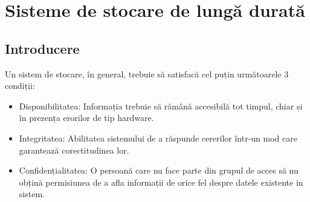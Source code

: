 \documentclass[oneside, 12pt]{book}
\begin{document}



\chapter{Sisteme de stocare de lungă durată}
\label{cha:long_term}

\section{Introducere}
\label{sec:long_term_systems_intro}

Un sistem de stocare, în general, trebuie să satisfacă cel puțin următoarele 3 condiții:
\begin{itemize}
	\item Disponibilitatea: Informația trebuie să rămână accesibilă tot timpul, chiar și în prezența erorilor de tip hardware.
	\item Integritatea: Abilitatea sistemului de a răspunde cererilor într-un mod care garantează corectitudinea lor.
	\item Confidențialitatea: O persoană care nu face parte din grupul de acces să nu obțină permisiunea de a afla informații de orice fel despre datele existente in sistem.
\end{itemize}
\end{document}
